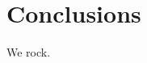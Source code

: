 \documentclass[twoside,a4paper]{article}
\begin{document}




%
\section{Conclusions} %
%

We rock.







%
%





\end{document}
